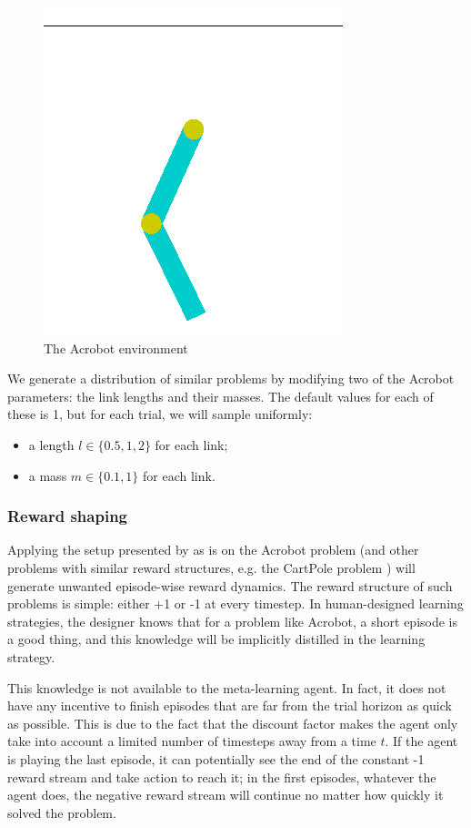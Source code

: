 \documentclass[letterpaper]{article}
\begin{document}
\begin{figure}[H]
	\centering
	\includegraphics[width=.4\linewidth]{fig/acrobot.png}
	\caption{The Acrobot environment}
	\label{fig:acrobot}
\end{figure}

We generate a distribution of similar problems by modifying
two of the Acrobot parameters: the link lengths and their masses. The default
values for each of these is 1, but for each trial, we will sample uniformly:
\begin{itemize}
	\item a length $l \in \{0.5, 1, 2\}$ for each link;
	\item a mass $m \in \{0.1, 1\}$ for each link.
\end{itemize}

\subsubsection{Reward shaping}
Applying the setup presented by \cite{learningtorl} as is on the Acrobot
problem (and other problems with similar reward structures, e.g. the
CartPole problem \citep{barto-cartpole}) will generate unwanted episode-wise
reward dynamics. The reward structure of such problems is simple:
either +1 or -1 at every timestep. In human-designed learning strategies, the
designer knows that for a problem like Acrobot, a short episode is a good thing,
and this knowledge will be implicitly distilled in the learning strategy. 

This knowledge is not available to the meta-learning agent. In fact, it does
not have any incentive to finish episodes that are far from the trial horizon
as quick as possible. This is due to the fact that the discount factor makes
the agent only take into account a limited number of timesteps away from a time
$t$. If the agent is playing the last episode, it can potentially see the
end of the constant -1 reward stream and take action to reach it; in the first
episodes, whatever the agent does, the negative reward stream will continue no 
matter how quickly it solved the problem. 
\end{document}
